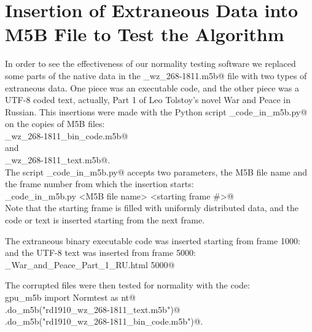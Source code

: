 \documentclass[letterpaper,twoside,12pt]{article}
\begin{document}
\section{Insertion of Extraneous Data into M5B File to Test the Algorithm}

In order to see the effectiveness of our normality testing software we replaced some parts of the native data in the _wz_268-1811.m5b@ file with two types of extraneous data. One piece was an executable code, and the other piece was a UTF-8 coded text, actually, Part 1 of Leo Tolstoy's novel War and Peace in Russian. This insertions were made with the Python script \verb@insert_code_in_m5b.py@ on the copies of M5B files:\\

\noindent {}_wz_268-1811_bin_code.m5b@ \\
\indent and \\
\noindent {}_wz_268-1811_text.m5b@.  \\

The script \verb@insert_code_in_m5b.py@ accepts two parameters, the M5B file name and the frame number from which the insertion starts: \\

\noindent \verb@insert_code_in_m5b.py <M5B file name> <starting frame #>@ \\

Note that the starting frame is filled with uniformly distributed data, and the code or text is inserted starting from the next frame.

The extraneous binary executable code was inserted starting from frame 1000: \\
\noindent \verb@%run insert_code_in_m5b.py rd1910_wz_268-1811_bin_code.m5b code1.bin 1000@ \\
\indent and the UTF-8 text was inserted from frame 5000: \\
\noindent \verb@%run insert_code_in_m5b.py rd1910_wz_268-1811_text.m5b@ \verb@\@ \\
\indent \indent \indent \indent \indent \indent    \verb@Tolstoy_War_and_Peace_Part_1_RU.html 5000@

The corrupted files were then tested for normality with the code: \\

\noindent \verb@from gpu_m5b import Normtest as nt@ \\
\noindent \verb@nt.do_m5b("rd1910_wz_268-1811_text.m5b")@ \\
\noindent \verb@nt.do_m5b("rd1910_wz_268-1811_bin_code.m5b")@. \\
\end{document}

